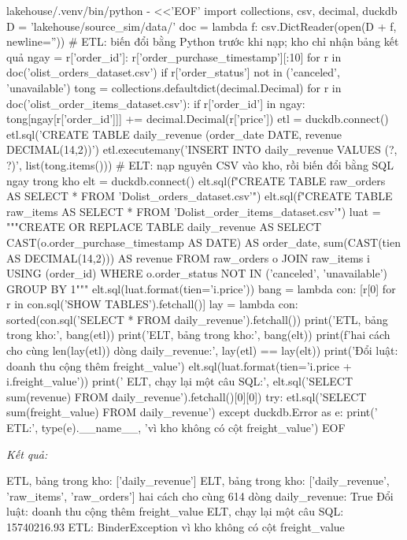 \begin{codeblock}
lakehouse/.venv/bin/python - <<'EOF'
import collections, csv, decimal, duckdb
D = 'lakehouse/source_sim/data/'
doc = lambda f: csv.DictReader(open(D + f, newline=''))
# ETL: biến đổi bằng Python trước khi nạp; kho chỉ nhận bảng kết quả
ngay = {r['order_id']: r['order_purchase_timestamp'][:10]
        for r in doc('olist_orders_dataset.csv')
        if r['order_status'] not in ('canceled', 'unavailable')}
tong = collections.defaultdict(decimal.Decimal)
for r in doc('olist_order_items_dataset.csv'):
    if r['order_id'] in ngay:
        tong[ngay[r['order_id']]] += decimal.Decimal(r['price'])
etl = duckdb.connect()
etl.sql('CREATE TABLE daily_revenue (order_date DATE, revenue DECIMAL(14,2))')
etl.executemany('INSERT INTO daily_revenue VALUES (?, ?)', list(tong.items()))
# ELT: nạp nguyên CSV vào kho, rồi biến đổi bằng SQL ngay trong kho
elt = duckdb.connect()
elt.sql(f"CREATE TABLE raw_orders AS SELECT * FROM '{D}olist_orders_dataset.csv'")
elt.sql(f"CREATE TABLE raw_items AS SELECT * FROM '{D}olist_order_items_dataset.csv'")
luat = """CREATE OR REPLACE TABLE daily_revenue AS
  SELECT CAST(o.order_purchase_timestamp AS DATE) AS order_date,
         sum(CAST({tien} AS DECIMAL(14,2))) AS revenue
  FROM raw_orders o JOIN raw_items i USING (order_id)
  WHERE o.order_status NOT IN ('canceled', 'unavailable') GROUP BY 1"""
elt.sql(luat.format(tien='i.price'))
bang = lambda con: [r[0] for r in con.sql('SHOW TABLES').fetchall()]
lay = lambda con: sorted(con.sql('SELECT * FROM daily_revenue').fetchall())
print('ETL, bảng trong kho:', bang(etl))
print('ELT, bảng trong kho:', bang(elt))
print(f'hai cách cho cùng {len(lay(etl))} dòng daily_revenue:', lay(etl) == lay(elt))
print('Đổi luật: doanh thu cộng thêm freight_value')
elt.sql(luat.format(tien='i.price + i.freight_value'))
print('  ELT, chạy lại một câu SQL:',
      elt.sql('SELECT sum(revenue) FROM daily_revenue').fetchall()[0][0])
try:
    etl.sql('SELECT sum(freight_value) FROM daily_revenue')
except duckdb.Error as e:
    print('  ETL:', type(e).__name__, 'vì kho không có cột freight_value')
EOF
\end{codeblock}
\textit{Kết quả:}
\begin{codeblock}
ETL, bảng trong kho: ['daily_revenue']
ELT, bảng trong kho: ['daily_revenue', 'raw_items', 'raw_orders']
hai cách cho cùng 614 dòng daily_revenue: True
Đổi luật: doanh thu cộng thêm freight_value
  ELT, chạy lại một câu SQL: 15740216.93
  ETL: BinderException vì kho không có cột freight_value
\end{codeblock}

